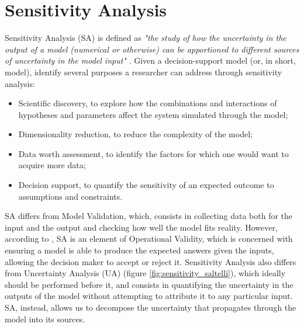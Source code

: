 
\section{Sensitivity Analysis} \label{sec:ch2_sa}

Sensitivity Analysis (SA) is defined as \textit{"the study of how the uncertainty in the output of a model  (numerical or otherwise)  can  be  apportioned to  different  sources  of uncertainty in the model input"} \cite{Saltelli2002SensitivityAF}. 
Given a decision-support model (or, in short, model), \textcite{RAZAVI2021104954} identify several purposes a researcher can address through sensitivity analysis:
\begin{itemize}
    \item Scientific discovery, to explore how the combinations and interactions of hypotheses and parameters affect the system simulated through the model;
    \item Dimensionality reduction, to reduce the complexity of the model;
    \item Data worth assessment, to identify the factors for which one would want to acquire more data;
    \item Decision support, to quantify the sensitivity of an expected outcome to assumptions and constraints.
\end{itemize}

SA differs from Model Validation, which, consists in collecting data both for the input and the output and checking how well the model fits reality. However, according to \textcite{Gass1983FeatureA}, SA is an element of Operational Validity, which is concerned with ensuring a model is able to produce the expected answers given the inputs, allowing the decision maker to accept or reject it.
Sensitivity Analysis also differs from Uncertainty Analysis (UA) (figure \ref{fig:sensitivity_saltelli}), which ideally should be performed before it, and consists in quantifying the uncertainty in the outputs of the model without attempting to attribute it to any particular input. SA, instead, allows us to decompose the uncertainty that propagates through the model into its sources.


